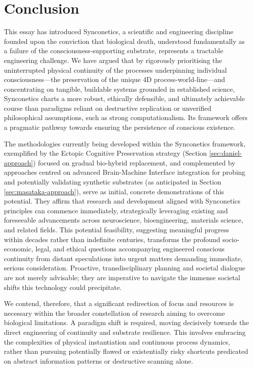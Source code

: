 \documentclass[10pt]{article}
\begin{document}
\begin{sloppypar}
  \section{Conclusion}
  \label{sec:conclusion}
  This essay has introduced Synconetics, a scientific and engineering discipline founded upon the conviction that biological death, understood fundamentally as a failure of the consciousness-supporting substrate, represents a tractable engineering challenge. We have argued that by rigorously prioritising the uninterrupted physical continuity of the processes underpinning individual consciousness—the preservation of the unique 4D process-world-line—and concentrating on tangible, buildable systems grounded in established science, Synconetics charts a more robust, ethically defensible, and ultimately achievable course than paradigms reliant on destructive replication or unverified philosophical assumptions, such as strong computationalism. Its framework offers a pragmatic pathway towards ensuring the persistence of conscious existence.

  The methodologies currently being developed within the Synconetics framework, exemplified by the Ectopic Cognitive Preservation strategy (Section \ref{sec:daniel-approach}) focused on gradual bio-hybrid replacement, and complemented by approaches centred on advanced Brain-Machine Interface integration for probing and potentially validating synthetic substrates (as anticipated in Section \ref{sec:masataka-approach}), serve as initial, concrete demonstrations of this potential. They affirm that research and development aligned with Synconetics principles can commence immediately, strategically leveraging existing and foreseeable advancements across neuroscience, bioengineering, materials science, and related fields. This potential feasibility, suggesting meaningful progress within decades rather than indefinite centuries, transforms the profound socio-economic, legal, and ethical questions accompanying engineered conscious continuity from distant speculations into urgent matters demanding immediate, serious consideration. Proactive, transdisciplinary planning and societal dialogue are not merely advisable; they are imperative to navigate the immense societal shifts this technology could precipitate.

  We contend, therefore, that a significant redirection of focus and resources is necessary within the broader constellation of research aiming to overcome biological limitations. A paradigm shift is required, moving decisively towards the direct engineering of continuity and substrate resilience. This involves embracing the complexities of physical instantiation and continuous process dynamics, rather than pursuing potentially flawed or existentially risky shortcuts predicated on abstract information patterns or destructive scanning alone.


\end{sloppypar}
\end{document}
